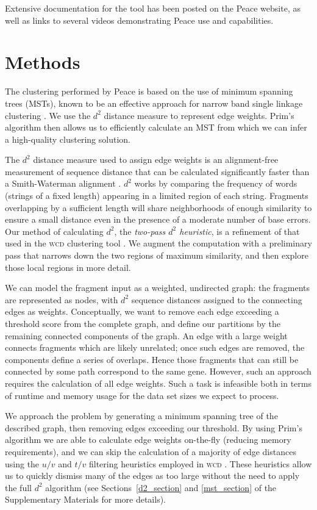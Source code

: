 \documentclass[a4,center,fleqn]{NAR}
\newcommand{\wcd}{\textsc{wcd }}
\begin{document}
Extensive documentation for the tool has been posted on the {\sc
  Peace} website, as well as links to several videos demonstrating
{\sc Peace} use and capabilities.


\section{Methods}

The clustering performed by {\sc Peace} is based on the use of minimum
spanning trees (MSTs), known to be an effective approach for narrow
band single linkage clustering \cite{Jain99,Wan08}. We use the $d^2$
distance measure \cite{Hide94} to represent edge weights.  Prim's
algorithm \cite{Prim57} then allows us to efficiently calculate an
MST from which we can infer a high-quality clustering solution.

The $d^2$ distance measure used to assign edge weights is an
alignment-free measurement of sequence distance that can be calculated
significantly faster than a Smith-Waterman alignment
\cite{Hide94,Foret09}.  $d^2$ works by comparing the frequency of
words (strings of a fixed length) appearing in a limited region of
each string.  Fragments overlapping by a sufficient length will share
neighborhoods of enough similarity to ensure a small distance even in
the presence of a moderate number of base errors.  Our method of
calculating $d^2$, the {\it two-pass $d^2$ heuristic}, is a refinement
of that used in the \wcd clustering tool \cite{Hazelhurst08a}.  We
augment the computation with a preliminary pass that narrows down the
two regions of maximum similarity, and then explore those local
regions in more detail.

We can model the fragment input as a weighted, undirected graph: the fragments
are represented as nodes, with $d^2$ sequence distances assigned to
the connecting edges as weights.  Conceptually, we want to remove each
edge exceeding a threshold score from the complete graph, and define
our partitions by the remaining connected components of the graph.  An
edge with a large weight connects fragments which are likely unrelated;
once such edges are removed, the components define a series of
overlaps.  Hence those fragments that can still be connected by some path
correspond to the same gene.  However, such an approach requires the
calculation of all edge weights.  Such a task is infeasible both in terms of
runtime and memory usage for the data set sizes we expect to process.

We approach the problem by generating a minimum spanning tree of the
described graph, then removing edges exceeding our threshold.  By
using Prim's algorithm we are able to calculate edge weights
on-the-fly (reducing memory requirements), and we can skip the
calculation of a majority of edge distances using the $u/v$ and $t/v$
filtering heuristics employed in \wcd \cite{Hazelhurst08a}.
These heuristics allow us to quickly dismiss many of the edges as too
large without the need to apply the full $d^2$ algorithm (see
Sections~\ref{d2_section} and \ref{mst_section} of the Supplementary
Materials for more details). 
\end{document}
